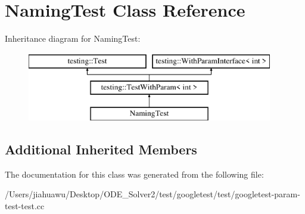 \hypertarget{class_naming_test}{}\section{Naming\+Test Class Reference}
\label{class_naming_test}
Inheritance diagram for Naming\+Test\+:\begin{figure}[H]
\begin{center}
\leavevmode
\includegraphics[height=3.000000cm]{class_naming_test}
\end{center}
\end{figure}
\subsection*{Additional Inherited Members}


The documentation for this class was generated from the following file\+:\begin{DoxyCompactItemize}
\item 
/\+Users/jiahuawu/\+Desktop/\+O\+D\+E\+\_\+\+Solver2/test/googletest/test/googletest-\/param-\/test-\/test.\+cc\end{DoxyCompactItemize}
